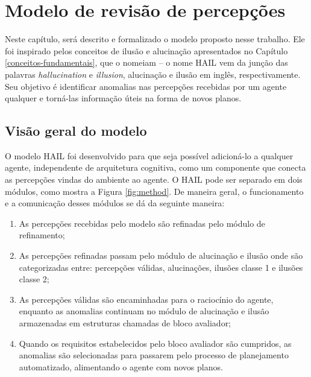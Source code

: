 \chapter{Modelo de revisão de percepções}

\label{chapter:model}

Neste capítulo, será descrito e formalizado o modelo proposto nesse trabalho. Ele foi inspirado pelos conceitos de ilusão e alucinação apresentados no Capítulo \ref{conceitos-fundamentais}, que o nomeiam -- o nome HAIL vem da junção das palavras \textit{hallucination} e \textit{illusion}, alucinação e ilusão em inglês, respectivamente. Seu objetivo é identificar anomalias nas percepções recebidas por um agente qualquer e torná-las informação úteis na forma de novos planos.

\section{Visão geral do modelo}

O modelo HAIL foi desenvolvido para que seja possível adicioná-lo a qualquer agente, independente de arquitetura cognitiva, como um componente que conecta as percepções vindas do ambiente ao agente. O HAIL pode ser separado em dois módulos, como mostra a Figura \ref{fig:method}. De maneira geral, o funcionamento e a comunicação desses módulos se dá da seguinte maneira:

\begin{enumerate}
    \item As percepções recebidas pelo modelo são refinadas pelo módulo de refinamento;
    \item As percepções refinadas passam pelo módulo de alucinação e ilusão onde são categorizadas entre:  percepções válidas, alucinações, ilusões classe 1 e ilusões classe 2;
    \item As percepções válidas são encaminhadas para o raciocínio do agente, enquanto as anomalias continuam no módulo de alucinação e ilusão armazenadas em estruturas chamadas de bloco avaliador;
    \item Quando os requisitos estabelecidos pelo bloco avaliador são cumpridos, as anomalias são selecionadas para passarem pelo processo de planejamento automatizado, alimentando o agente com novos planos.\end{enumerate}

